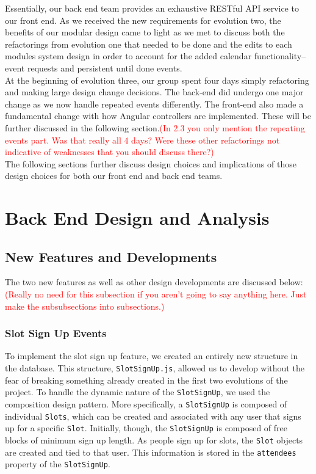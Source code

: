 \documentclass[11pt]{article}   %
\newcommand{\dcomment}[1]{\textcolor{red}{#1}}
\begin{document}
\noindent Essentially, our back end team provides an exhaustive RESTful API service to our front end. As we received the new requirements for evolution two, the benefits of our modular design came to light as we met to discuss both the refactorings from evolution one that needed to be done and the edits to each modules system design in order to account for the added calendar functionality--event requests and persistent until done events.\\

\noindent At the beginning of evolution three, our group spent four days simply refactoring and making large design change decisions.  The back-end did undergo one major change as we now handle repeated events differently. The front-end also made a fundamental change with how Angular controllers are implemented. These will be further discussed in the following section.\dcomment{(In 2.3 you only mention the repeating events part. Was that really all 4 days?  Were these other refactorings not indicative of weaknesses that you should discuss there?) }\\

\noindent The following sections further discuss design choices and implications of those design choices for both our front end and back end teams. \\

\section{Back End Design and Analysis}
\subsection{New Features and Developments}
The two new features as well as other design developments are discussed below:
\dcomment{(Really no need for this subsection if you aren't going to say anything here.  Just
make the subsubsections into subsections.)}
\subsubsection{Slot Sign Up Events}
To implement the slot sign up feature, we created an entirely new structure in the database. This structure, \texttt{SlotSignUp.js}, allowed us to develop without the fear of breaking something already created in the first two evolutions of the project. To handle the dynamic nature of the \texttt{SlotSignUp}, we used the composition design pattern. More specifically, a \texttt{SlotSignUp} is composed of individual \texttt{Slots}, which can be created and associated with any user that signs up for a specific \texttt{Slot}. Initially, though, the \texttt{SlotSignUp} is composed of free blocks of minimum sign up length. As people sign up for slots, the \texttt{Slot} objects are created and tied to that user. This information is stored in the \texttt{attendees} property of the \texttt{SlotSignUp}. \\
\end{document}
